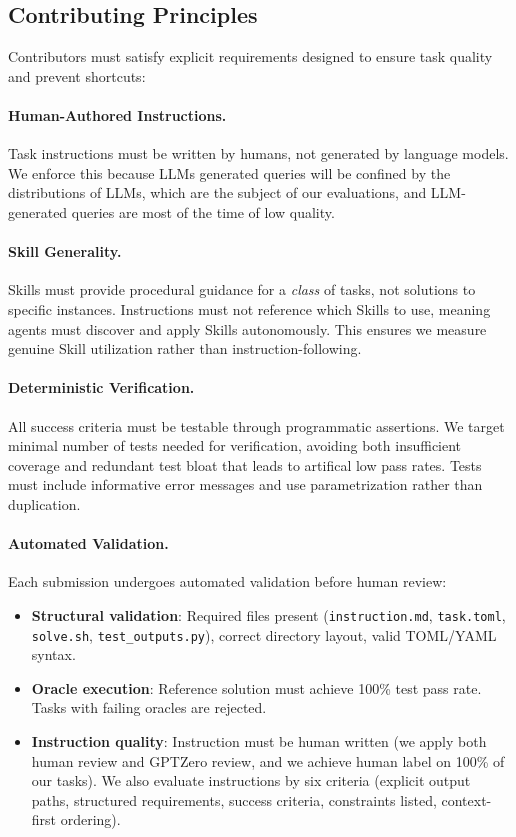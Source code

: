 \subsection{Contributing Principles}
Contributors must satisfy explicit requirements designed to ensure task quality and prevent shortcuts:

\paragraph{Human-Authored Instructions.}
Task instructions must be written by humans, not generated by language models. We enforce this because LLMs generated queries will be confined by the distributions of LLMs, which are the subject of our evaluations, and LLM-generated queries are most of the time of low quality. 

\paragraph{Skill Generality.}
Skills must provide procedural guidance for a \emph{class} of tasks, not solutions to specific instances. Instructions must not reference which Skills to use, meaning agents must discover and apply Skills autonomously. This ensures we measure genuine Skill utilization rather than instruction-following.

\paragraph{Deterministic Verification.}
All success criteria must be testable through programmatic assertions. We target minimal number of tests needed for verification, avoiding both insufficient coverage and redundant test bloat that leads to artifical low pass rates. Tests must include informative error messages and use parametrization rather than duplication.

\paragraph{Automated Validation.}
Each submission undergoes automated validation before human review:
\begin{itemize}[nosep,leftmargin=*]
    \item \textbf{Structural validation}: Required files present (\texttt{instruction.md}, \texttt{task.toml}, \texttt{solve.sh}, \texttt{test\_outputs.py}), correct directory layout, valid TOML/YAML syntax.
    \item \textbf{Oracle execution}: Reference solution must achieve 100\% test pass rate. Tasks with failing oracles are rejected.
    \item \textbf{Instruction quality}: Instruction must be human written (we apply both human review and GPTZero review, and we achieve human label on 100\% of our tasks). We also evaluate instructions by six criteria (explicit output paths, structured requirements, success criteria, constraints listed, context-first ordering).
\end{itemize}

